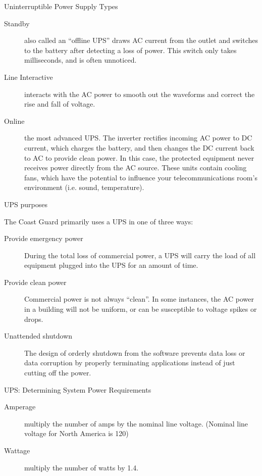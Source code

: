 \documentclass[landscape,fontscale=1,margin=0.2cm,paperwidth=70truecm, paperheight=40truecm,debug]{baposter}
\begin{document}
\begin{poster}
\begin{posterbox}[column=3,textborder=rounded]{Uninterruptible Power Supply Types}
\begin{description}
\item[Standby] also called an ``offline UPS'' draws AC current from the outlet and switches to the battery after detecting a loss of power. This switch only takes milliseconds, and is often unnoticed.
\item[Line Interactive] interacts with the AC power to smooth out the waveforms and correct the rise and fall of voltage.
\item[Online] the most advanced UPS. The inverter rectifies incoming AC power to DC current, which charges the battery, and then changes the DC current back to AC to provide clean power. In this case, the protected equipment never receives power directly from the AC source. These units contain cooling fans, which have the potential to influence your telecommunications room's environment (i.e. sound, temperature).
\end{description}
\end{posterbox}
\begin{posterbox}[column=3,below=auto]{UPS purposes}
\begin{center}
The Coast Guard primarily uses a UPS in one of three ways:
\end{center}
\begin{description}
\item[Provide emergency power] During the total loss of commercial power, a UPS will carry the load of all equipment plugged into the UPS for an amount of time.
\item[Provide clean power] Commercial power is not always ``clean''. In some instances, the AC power in a building will not be uniform, or can be susceptible to voltage spikes or drops.
\item[Unattended shutdown] The design of orderly shutdown from the software prevents data loss or data corruption by properly terminating applications instead of just cutting off the power. 
\end{description}
\end{posterbox}
\begin{posterbox}[column=3,below=auto,textborder=rounded]{UPS: Determining System Power Requirements}
\begin{description}
\item[Amperage] multiply the number of amps by the nominal line voltage. (Nominal line voltage for North America is 120)
\item[Wattage] multiply the number of watts by 1.4.
\end{description}

\end{posterbox}
\end{poster}
\end{document}
